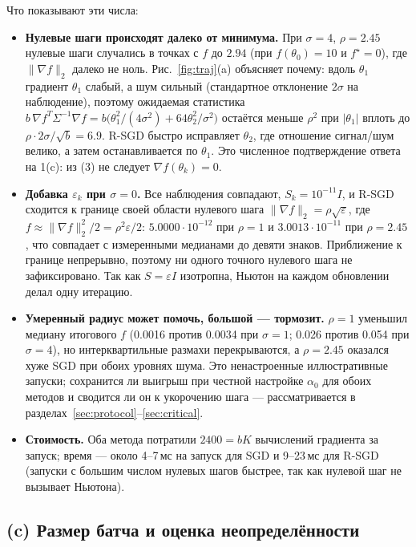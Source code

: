 \documentclass[11pt,a4paper]{article}
\newcommand{\norm}[1]{\lVert #1\rVert_2}
\begin{document}
Что показывают эти числа:
\begin{itemize}
\item \textbf{Нулевые шаги происходят далеко от минимума.} При $\sigma=4$,
$\rho=2.45$ нулевые шаги случались в точках с $f$ до $2.94$ (при $f(\theta_0)=10$ и
$f^\star=0$), где $\norm{\nabla f}$ далеко не ноль. Рис.~\ref{fig:traj}(a) объясняет
почему: вдоль $\theta_1$ градиент $\theta_1$ слабый, а шум сильный (стандартное
отклонение $2\sigma$ на наблюдение), поэтому ожидаемая статистика
$b\,\nabla f^T\Sigma^{-1}\nabla f=b\big(\theta_1^2/(4\sigma^2)+64\theta_2^2/\sigma^2\big)$
остаётся меньше $\rho^2$ при $|\theta_1|$ вплоть до $\rho\cdot2\sigma/\sqrt b=6.9$.
R-SGD быстро исправляет $\theta_2$, где отношение сигнал/шум велико, а затем
останавливается по $\theta_1$. Это численное подтверждение ответа на 1(c): из (3) не
следует $\nabla f(\theta_k)=0$.
\item \textbf{Добавка $\varepsilon_k$ при $\sigma=0$.} Все наблюдения совпадают,
$S_k=10^{-11}I$, и R-SGD сходится к границе своей области нулевого шага
$\norm{\nabla f}=\rho\sqrt{\varepsilon}$, где
$f\approx\norm{\nabla f}^2/2=\rho^2\varepsilon/2$: $5.0000\cdot10^{-12}$ при $\rho=1$
и $3.0013\cdot10^{-11}$ при $\rho=2.45$, что совпадает с измеренными медианами до
девяти знаков. Приближение к границе непрерывно, поэтому ни одного точного нулевого шага
не зафиксировано. Так как $S=\varepsilon I$ изотропна, Ньютон на каждом обновлении
делал одну итерацию.
\item \textbf{Умеренный радиус может помочь, большой — тормозит.} $\rho=1$ уменьшил
медиану итогового $f$ (0.0016 против 0.0034 при $\sigma=1$; 0.026 против 0.054 при
$\sigma=4$), но интерквартильные размахи перекрываются, а $\rho=2.45$ оказался хуже SGD
при обоих уровнях шума. Это ненастроенные иллюстративные запуски; сохранится ли выигрыш
при честной настройке $\alpha_0$ для обоих методов и сводится ли он к укорочению шага —
рассматривается в разделах~\ref{sec:protocol}--\ref{sec:critical}.
\item \textbf{Стоимость.} Оба метода потратили $2400=bK$ вычислений градиента за
запуск; время — около 4--7\,мс на запуск для SGD и 9--23\,мс для R-SGD (запуски с
большим числом нулевых шагов быстрее, так как нулевой шаг не вызывает Ньютона).
\end{itemize}

\subsection{(c) Размер батча и оценка неопределённости}\label{sec:batch}
\end{document}
